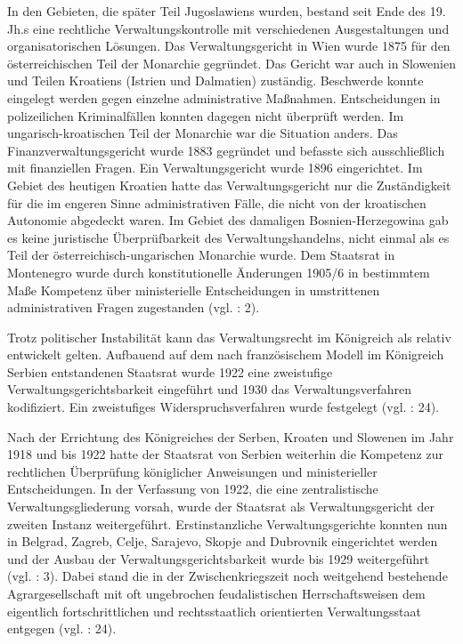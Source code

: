 In den Gebieten, die später Teil Jugoslawiens wurden, bestand seit Ende des 19. Jh.s eine rechtliche Verwaltungskontrolle mit verschiedenen Ausgestaltungen und organisatorischen Lösungen. Das Verwaltungsgericht in Wien wurde 1875 für den österreichischen Teil der Monarchie gegründet. Das Gericht war auch in Slowenien und Teilen Kroatiens (Istrien und Dalmatien) zuständig. Beschwerde konnte eingelegt werden gegen einzelne administrative Maßnahmen. Entscheidungen in polizeilichen Kriminalfällen konnten dagegen nicht überprüft werden. Im ungarisch-kroatischen Teil der Monarchie war die Situation anders. Das Finanzverwaltungsgericht wurde 1883 gegründet und befasste sich ausschließlich mit finanziellen Fragen. Ein Verwaltungsgericht wurde 1896 eingerichtet. Im Gebiet des heutigen Kroatien hatte das Verwaltungsgericht nur die Zuständigkeit für die im engeren Sinne administrativen Fälle, die nicht von der kroatischen Autonomie abgedeckt waren. Im Gebiet des damaligen Bosnien-Herzegowina gab es keine juristische Überprüfbarkeit des Verwaltungshandelns, nicht einmal als es Teil der österreichisch-ungarischen Monarchie wurde. Dem Staatsrat in Montenegro wurde durch konstitutionelle Änderungen 1905/6 in bestimmtem Maße Kompetenz über ministerielle Entscheidungen in umstrittenen administrativen Fragen zugestanden (vgl. \cite{kopric} : 2).\par
Trotz politischer Instabilität kann das Verwaltungsrecht im Königreich als relativ entwickelt gelten. Aufbauend auf dem nach französischem Modell im Königreich Serbien entstandenen Staatsrat wurde 1922 eine zweistufige Verwaltungsgerichtsbarkeit eingeführt und 1930 das Verwaltungsverfahren kodifiziert. Ein zweistufiges Widerspruchsverfahren wurde festgelegt (vgl. \cite{lucht} : 24).
\par
Nach der Errichtung des Königreiches der Serben, Kroaten und Slowenen im Jahr 1918 und bis 1922 hatte der Staatsrat von Serbien weiterhin die Kompetenz zur rechtlichen Überprüfung königlicher Anweisungen und ministerieller Entscheidungen. In der Verfassung von 1922, die eine zentralistische Verwaltungsgliederung vorsah, wurde der Staatsrat als Verwaltungsgericht der zweiten Instanz weitergeführt. Erstinstanzliche Verwaltungsgerichte konnten nun in Belgrad, Zagreb, Celje, Sarajevo, Skopje and Dubrovnik eingerichtet werden und der Ausbau der Verwaltungsgerichtsbarkeit wurde bis 1929 weitergeführt (vgl. \cite{kopric} : 3). Dabei stand die in der Zwischenkriegszeit noch weitgehend bestehende Agrargesellschaft mit oft ungebrochen feudalistischen Herrschaftsweisen dem eigentlich fortschrittlichen und rechtsstaatlich orientierten Verwaltungsstaat entgegen (vgl. \cite{lucht} : 24).

